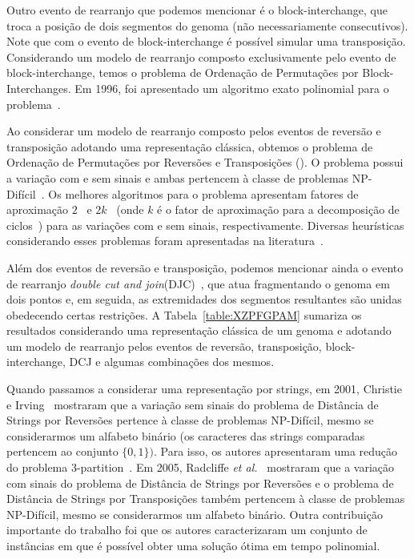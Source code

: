 Outro evento de rearranjo que podemos mencionar é o block-interchange, que troca a posição de dois segmentos do genoma (não necessariamente consecutivos). Note que com o evento de block-interchange é possível simular uma transposição. Considerando um modelo de rearranjo composto exclusivamente pelo evento de block-interchange, temos o problema de Ordenação de Permutações por Block-Interchanges. Em 1996, foi apresentado um algoritmo exato polinomial para o problema~\cite{1996-christie}.

Ao considerar um modelo de rearranjo composto pelos eventos de reversão e transposição adotando uma representação clássica, obtemos o problema de Ordenação de Permutações por Reversões e Transposições (\SbRT). O problema possui a variação com e sem sinais e ambas pertencem à classe de problemas NP-Difícil~\cite{2019b-oliveira-etal}. Os melhores algoritmos para o problema apresentam fatores de aproximação $2$~\cite{1998-walter-etal} e $2k$~\cite{2008-rahman-etal} (onde $k$ é o fator de aproximação para a decomposição de ciclos~\cite{2013-chen}) para as variações com e sem sinais, respectivamente. Diversas heurísticas considerando esses problemas foram apresentadas na literatura~\cite{2014a-dias-etal,2018-brito-etal}.

Além dos eventos de reversão e transposição, podemos mencionar ainda o evento de rearranjo \emph{double cut and join}(DJC)~\cite{2005-yancopoulos-etal}, que atua fragmentando o genoma em dois pontos e, em seguida, as extremidades dos segmentos resultantes são unidas obedecendo certas restrições. A Tabela~\ref{table:XZPFGPAM} sumariza os resultados considerando uma representação clássica de um genoma e adotando um modelo de rearranjo pelos eventos de reversão, transposição, block-interchange, DCJ e algumas combinações dos mesmos. 



Quando passamos a considerar uma representação por strings, em 2001, Christie e Irving~\cite{2001-christie-irving} mostraram que a variação sem sinais do problema de Distância de Strings por Reversões pertence à classe de problemas NP-Difícil, mesmo se considerarmos um alfabeto binário (os caracteres das strings comparadas pertencem ao conjunto $\{0,1\})$. Para isso, os autores apresentaram uma redução do problema 3-partition~\cite{1990-garey-johnson}. Em 2005, Radcliffe \textit{et al.}~\cite{2005-radcliffe-etal} mostraram que a variação com sinais do problema de Distância de Strings por Reversões e o problema de Distância de Strings por Transposições também pertencem à classe de problemas NP-Difícil, mesmo se considerarmos um alfabeto binário. Outra contribuição importante do trabalho foi que os autores caracterizaram um conjunto de instâncias em que é possível obter uma solução ótima em tempo polinomial.

